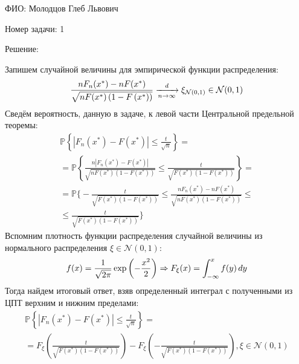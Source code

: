 \documentclass[14pt]{extarticle}
\begin{document}
ФИО: Молодцов Глеб Львович

\vspace{10pt}

Номер задачи: 1

\vspace{10pt}

Решение:

\vspace{10pt}
Запишем случайной величины для эмпирической функции распределения:
\begin{equation}
    \notag
    \frac{nF_n(x^*)-nF(x^*)}{\sqrt{nF(x^*) \left( 1-F \left(x^* \right) \right)}} \xrightarrow[n \rightarrow \infty]{d} \xi_{\mathcal{N}(0,1)} \in \mathcal{N}(0,1)
\end{equation}
Сведём вероятность, данную в задаче, к левой части Центральной предельной теоремы:
\begin{multline*}
    \mathbb{P} \left\{ |F_n(x^*)-F(x^*)| \leqslant \frac{t}{\sqrt{n}}\right\} = \\ =
    \mathbb{P}\left\{\frac{n|F_n(x^*)-F(x^*)|}{\sqrt{n F(x^*) \left( 1-F \left(x^* \right) \right)}} \leqslant \frac{t}{\sqrt{F(x^*) \left( 1-F \left(x^* \right) \right)}}\right\} = \\
    = \mathbb{P}\biggl\{ - \frac{t}{\sqrt{F(x^*) \left( 1-F \left(x^* \right) \right)}}
    \leqslant \frac{nF_n(x^*)-nF(x^*)}{\sqrt{n F(x^*) \left( 1-F \left(x^* \right) \right)}} \leqslant \\
    \leqslant \frac{t}{\sqrt{F(x^*) \left( 1-F\left(x^* \right) \right)}} \biggr\} 
\end{multline*}
Вспомним плотность функции распределения случайной величины из нормального распределения $\xi \in \mathcal{N}(0,1)$:
\begin{equation}
    \notag
    f(x) = \frac{1}{\sqrt{2 \pi}} \exp\left(-\frac{x^2}{2} \right) \Rightarrow F_\xi(x) = \int_{-\infty}^{x} f(y) \,dy 
\end{equation} 
Тогда найдем итоговый ответ, взяв определенный интеграл с полученными из ЦПТ верхним и нижним пределами:
\begin{multline*}
    \mathbb{P} \left\{ |F_n(x^*)-F(x^*)| \leqslant \frac{t}{\sqrt{n}}\right\} = \\
    = F_\xi \left(\frac{t}{\sqrt{F(x^*) \left( 1-F \left(x^* \right) \right)}} \right) - F_\xi\left(- \frac{t}{\sqrt{F(x^*) \left( 1-F \left(x^* \right) \right)}} \right) ,\xi \in \mathcal{N}(0,1)
\end{multline*}
\end{document}
